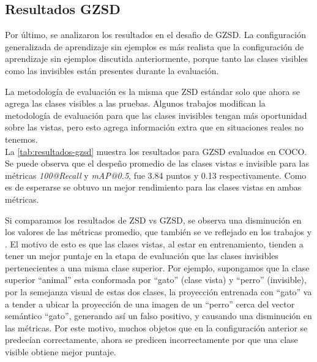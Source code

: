 \subsection{Resultados GZSD}
Por último, se analizaron los resultados en el desafio de GZSD. La configuración generalizada de aprendizaje sin ejemplos es más realista que la configuración de aprendizaje sin ejemplos discutida anteriormente, porque tanto las clases visibles como las invisibles están presentes durante la evaluación.

La metodología de evaluación es la misma que ZSD estándar solo que ahora se agrega las clases visibles a las pruebas. Algunos trabajos modifican la metodología de evaluación para que las clases invisibles tengan más oportunidad sobre las vistas, pero esto agrega información extra que en situaciones reales no tenemos.\\

La \autoref{tab:resultados-gzsd} muestra los resultados para GZSD evaluados en COCO. Se puede observa que el despeño promedio de las clases vistas e invisible para las métricas \textit{100@Recall} y \textit{mAP@0.5}, fue 3.84 puntos y 0.13 respectivamente. Como es de esperarse se obtuvo un mejor rendimiento para las clases vistas en ambas métricas.

Si comparamos los resultados de ZSD vs GZSD, se observa una disminución en los valores de las métricas promedio, que también se ve reflejado en los trabajos \cite{bansal2018zero} y \cite{rahman2020zero}. El motivo de esto es que las clases vistas, al estar en entrenamiento, tienden a tener un mejor puntaje en la etapa de evaluación que las clases invisibles pertenecientes a una misma clase superior. Por ejemplo, supongamos que la clase superior ``animal'' esta conformada por ``gato'' (clase vista) y ``perro'' (invisible), por la semejanza visual de estas dos clases, la proyección entrenada con ``gato'' va a tender a ubicar la proyección de una imagen de un ``perro'' cerca del vector semántico ``gato'', generando así un falso positivo, y causando una disminución en las métricas. Por este motivo, muchos objetos que en la configuración anterior se predecían correctamente, ahora se predicen incorrectamente por que una clase visible obtiene mejor puntaje.\\


